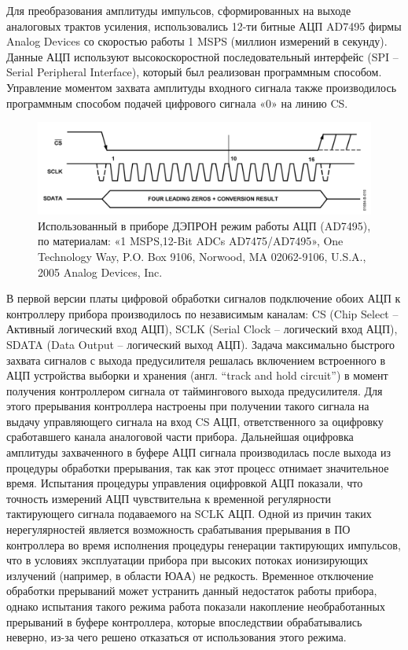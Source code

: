 Для преобразования амплитуды импульсов, сформированных на выходе аналоговых трактов усиления, использовались 12-ти битные АЦП AD7495 фирмы Analog Devices со скоростью работы 1 MSPS (миллион измерений в секунду). Данные АЦП используют высокоскоростной последовательный интерфейс (SPI -- Serial Peripheral Interface), который был реализован программным способом. Управление моментом захвата амплитуды входного сигнала также производилось программным способом подачей цифрового сигнала «0» на линию CS. 
\begin{figure}
	\centering
	\includegraphics[width=0.7\linewidth]{images/adc}
	\caption{Использованный в приборе ДЭПРОН режим работы АЦП (AD7495), по материалам:  «1 MSPS,12-Bit ADCs  AD7475/AD7495», One Technology Way, P.O. Box 9106, Norwood, MA 02062-9106, U.S.A., 2005 Analog Devices, Inc.}
	\label{fig:adc}
\end{figure}

В первой версии платы цифровой обработки сигналов подключение обоих АЦП к контроллеру прибора производилось по независимым каналам: CS (Chip Select -- Активный логический вход АЦП), SCLK (Serial Clock -- логический вход АЦП), SDATA (Data Output -- логический выход АЦП). Задача максимально быстрого захвата сигналов с выхода предусилителя решалась включением встроенного в АЦП устройства выборки и хранения (англ. ``track and hold circuit'') в момент получения контроллером сигнала от таймингового выхода предусилителя. Для этого прерывания контроллера настроены при получении такого сигнала на выдачу управляющего сигнала на вход CS АЦП, ответственного за оцифровку сработавшего канала аналоговой части прибора. Дальнейшая оцифровка амплитуды захваченного в буфере АЦП сигнала производилась после выхода из процедуры обработки прерывания, так как этот процесс отнимает значительное время. Испытания процедуры управления оцифровкой АЦП показали, что точность измерений АЦП чувствительна к временной регулярности тактирующего сигнала подаваемого на SCLK АЦП. Одной из причин таких нерегулярностей является возможность срабатывания прерывания в ПО контроллера во время исполнения процедуры генерации тактирующих импульсов, что в условиях эксплуатации прибора при высоких потоках ионизирующих излучений (например, в области ЮАА) не редкость. Временное отключение обработки прерываний может устранить данный недостаток работы прибора, однако испытания такого режима работа показали накопление необработанных прерываний в буфере контроллера, которые впоследствии обрабатывались неверно, из-за чего решено отказаться от использования этого режима.


